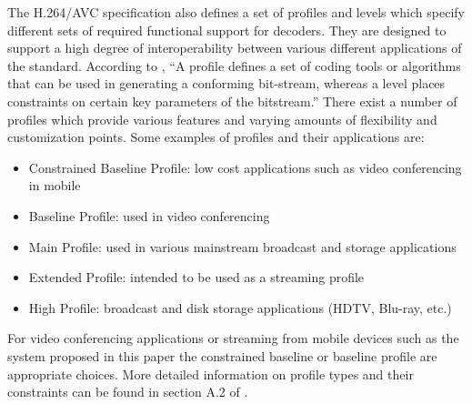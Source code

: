 \documentclass[3p,times,procedia]{elsarticle}
\begin{document}
The H.264/AVC specification also defines a set of profiles and levels which specify different sets of required functional support for decoders. They are designed to support a high degree of interoperability between various different applications of the standard. According to \cite{H264AVCOverview}, ``A profile defines a set of coding tools or algorithms that can be used in generating a conforming bit-stream, whereas a level places constraints on certain key parameters of the bitstream.'' There exist a number of profiles which provide various features and varying amounts of flexibility and customization points. Some examples of profiles and their applications are:
\begin{itemize}
\item Constrained Baseline Profile: low cost applications such as video conferencing in mobile
\item Baseline Profile: used in video conferencing
\item Main Profile: used in various mainstream broadcast and storage applications
\item  Extended Profile: intended to be used as a streaming profile
\item  High Profile: broadcast and disk storage applications (HDTV, Blu-ray, etc.)
\end{itemize}
For video conferencing applications or streaming from mobile devices such as the system proposed in this paper the constrained baseline or baseline profile are appropriate choices. More detailed information on profile types and their constraints can be found in section A.2 of \cite{H264Spec}.
\end{document}

